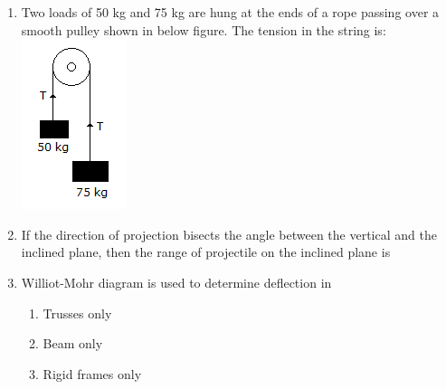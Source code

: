 \documentclass[11pt,a4paper]{article}
\begin{document}
\begin{enumerate}
\\
\item{Two loads of 50 kg and 75 kg are hung at the ends of a rope passing over a smooth pulley shown in below figure. The tension in the string is: \\

\includegraphics{../data_img/applied-mechanics-and-graphic-statics_1525413496-9.png}
}
\\
\item{If the direction of projection bisects the angle between the vertical and the inclined plane, then the range of projectile on the inclined plane is}
\\
\item{Williot-Mohr diagram is used to determine deflection in}
\begin{enumerate}[label=\Alph*.]
\item{Trusses only}
\item{Beam only}
\item{Rigid frames only}

\end{enumerate}
\end{enumerate}
\end{document}
